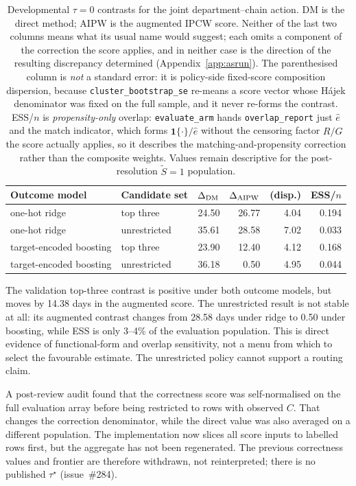 \documentclass[11pt,a4paper]{article}
\theoremstyle{plain}
\theoremstyle{definition}
\theoremstyle{remark}
\newcommand{\Sproxy}{\widetilde S}
\begin{document}
\begin{table}[h]
\centering
\caption{Developmental $\tau=0$ contrasts for the joint department--chain action.
DM is the direct method; AIPW is the augmented IPCW score. Neither of the last two columns means
what its usual name would suggest; each omits a component of the correction the score applies, and
in neither case is the direction of the resulting discrepancy determined
(Appendix~\ref{app:asrun}). The parenthesised column is \emph{not} a standard error: it is
policy-side fixed-score composition dispersion, because \texttt{cluster\_bootstrap\_se} re-means a
score vector whose H\'ajek denominator was fixed on the full sample, and it never re-forms the
contrast. ESS/$n$ is \emph{propensity-only} overlap: \texttt{evaluate\_arm} hands
\texttt{overlap\_report} just $\hat e$ and the match indicator, which forms
$\mathbf 1\{\cdot\}/\hat e$ without the censoring factor $R/\hat G$ the score actually applies, so
it describes the matching-and-propensity correction rather than the composite weights. Values
remain descriptive for the post-resolution $\Sproxy=1$ population.}
\label{tab:provisional}
\begin{tabular}{llrrrr}
\toprule
Outcome model & Candidate set & $\Delta_{\rm DM}$ & $\Delta_{\rm AIPW}$ & (disp.) & ESS/$n$\\
\midrule
one-hot ridge & top three & 24.50 & 26.77 & 4.04 & 0.194\\
one-hot ridge & unrestricted & 35.61 & 28.58 & 7.02 & 0.033\\
target-encoded boosting & top three & 23.90 & 12.40 & 4.12 & 0.168\\
target-encoded boosting & unrestricted & 36.18 & 0.50 & 4.95 & 0.044\\
\bottomrule
\end{tabular}
\end{table}

The validation top-three contrast is positive under both outcome models, but moves by 14.38 days
in the augmented score. The unrestricted result is not stable at all: its augmented contrast
changes from 28.58 days under ridge to 0.50 under boosting, while ESS is only 3--4\% of the
evaluation population. This is direct evidence of functional-form and overlap
sensitivity, not a menu from which to select the favourable estimate. The unrestricted policy
cannot support a routing claim.

A post-review audit found that the correctness score was self-normalised on the full evaluation
array before being restricted to rows with observed $C$. That changes the correction denominator,
while the direct value was also averaged on a different population. The implementation now slices
all score inputs to labelled rows first, but the aggregate has not been regenerated. The previous
correctness values and frontier are therefore withdrawn, not reinterpreted; there is no published
$\tau^\star$ (issue~\#284).
\end{document}
